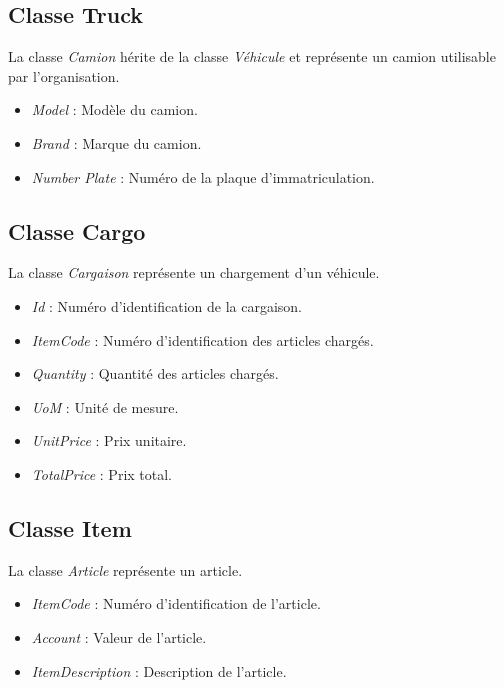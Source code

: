 \subsection{Classe Truck}
La classe \textit{Camion} hérite de la classe \textit{Véhicule} et représente un camion utilisable par l'organisation.
\begin{itemize}
	\item \textit{Model} : Modèle du camion.
	\item \textit{Brand} : Marque du camion.
	\item \textit{Number Plate} : Numéro de la plaque d'immatriculation.
\end{itemize}

\subsection{Classe Cargo}
La classe \textit{Cargaison} représente un chargement d'un véhicule.
\begin{itemize}
	\item \textit{Id} : Numéro d'identification de la cargaison.
	\item \textit{ItemCode} : Numéro d'identification des articles chargés.
	\item \textit{Quantity} : Quantité des articles chargés.
	\item \textit{UoM} : Unité de mesure.
	\item \textit{UnitPrice} : Prix unitaire.
	\item \textit{TotalPrice} : Prix total.
\end{itemize}

\subsection{Classe Item}
La classe \textit{Article} représente un article.
\begin{itemize}
	\item \textit{ItemCode} : Numéro d'identification de l'article.
	\item \textit{Account} : Valeur de l'article.	
	\item \textit{ItemDescription} : Description de l'article.
\end{itemize}

